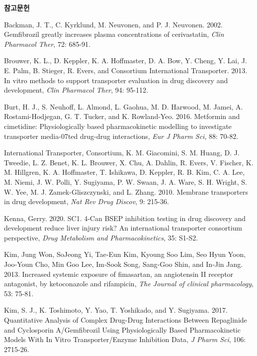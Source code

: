 \documentclass[
  11pt,
  krantz2, a4paper, twoside]{krantz}
\begin{document}
\textbf{참고문헌}

Backman, J. T., C. Kyrklund, M. Neuvonen, and P. J. Neuvonen. 2002.
\textquotesingle Gemfibrozil greatly increases plasma concentrations of cerivastatin\textquotesingle,
\emph{Clin Pharmacol Ther}, 72: 685-91.

Brouwer, K. L., D. Keppler, K. A. Hoffmaster, D. A. Bow, Y. Cheng, Y.
Lai, J. E. Palm, B. Stieger, R. Evers, and Consortium International
Transporter. 2013. \textquotesingle In vitro methods to support transporter evaluation
in drug discovery and development\textquotesingle, \emph{Clin Pharmacol Ther}, 94: 95-112.

Burt, H. J., S. Neuhoff, L. Almond, L. Gaohua, M. D. Harwood, M. Jamei,
A. Rostami-Hodjegan, G. T. Tucker, and K. Rowland-Yeo. 2016. \textquotesingle Metformin
and cimetidine: Physiologically based pharmacokinetic modelling to
investigate transporter media-07ted drug-drug interactions\textquotesingle, \emph{Eur J Pharm
Sci}, 88: 70-82.

International Transporter, Consortium, K. M. Giacomini, S. M. Huang, D.
J. Tweedie, L. Z. Benet, K. L. Brouwer, X. Chu, A. Dahlin, R. Evers, V.
Fischer, K. M. Hillgren, K. A. Hoffmaster, T. Ishikawa, D. Keppler, R.
B. Kim, C. A. Lee, M. Niemi, J. W. Polli, Y. Sugiyama, P. W. Swaan, J.
A. Ware, S. H. Wright, S. W. Yee, M. J. Zamek-Gliszczynski, and L.
Zhang. 2010. \textquotesingle Membrane transporters in drug development\textquotesingle, \emph{Nat Rev
Drug Discov}, 9: 215-36.

Kenna, Gerry. 2020. \textquotesingle SC1. 4-Can BSEP inhibition testing in drug
discovery and development reduce liver injury risk? An international
transporter consortium perspective\textquotesingle, \emph{Drug Metabolism and
Pharmacokinetics}, 35: S1-S2.

Kim, Jung Won, SoJeong Yi, Tae‐Eun Kim, Kyoung Soo Lim, Seo Hyun Yoon,
Joo‐Youn Cho, Min Goo Lee, Im‐Sook Song, Sang‐Goo Shin, and In‐Jin Jang.
2013. \textquotesingle Increased systemic exposure of fimasartan, an angiotensin II
receptor antagonist, by ketoconazole and rifampicin\textquotesingle, \emph{The Journal of
clinical pharmacology}, 53: 75-81.

Kim, S. J., K. Toshimoto, Y. Yao, T. Yoshikado, and Y. Sugiyama. 2017.
\textquotesingle Quantitative Analysis of Complex Drug-Drug Interactions Between
Repaglinide and Cyclosporin A/Gemfibrozil Using Physiologically Based
Pharmacokinetic Models With In Vitro Transporter/Enzyme Inhibition
Data\textquotesingle, \emph{J Pharm Sci}, 106: 2715-26.
\end{document}
